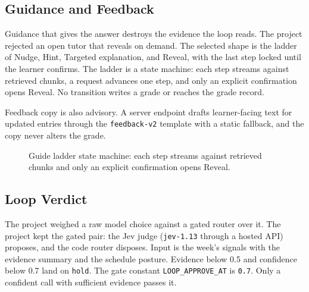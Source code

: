\subsection{Guidance and Feedback}
Guidance that gives the answer destroys the evidence the loop reads. The project rejected an open tutor that reveals on demand. The selected shape is the ladder of Nudge, Hint, Targeted explanation, and Reveal, with the last step locked until the learner confirms. The ladder is a state machine: each step streams against retrieved chunks, a request advances one step, and only an explicit confirmation opens Reveal. No transition writes a grade or reaches the grade record.

Feedback copy is also advisory. A server endpoint drafts learner-facing text for updated entries through the \texttt{feedback-v2} template with a static fallback, and the copy never alters the grade.

\begin{figure}[htbp]
\centering
{}
\caption{Guide ladder state machine: each step streams against retrieved chunks and only an explicit confirmation opens Reveal.}
\label{fig:guide-ladder}
\end{figure}

\subsection{Loop Verdict}
The project weighed a raw model choice against a gated router over it. The project kept the gated pair: the Jev judge (\texttt{jev-1.13} through a hosted API) proposes, and the code router disposes. Input is the week's signals with the evidence summary and the schedule posture. Evidence below 0.5 and confidence below 0.7 land on \texttt{hold}. The gate constant \texttt{LOOP\_APPROVE\_AT} is \texttt{0.7}. Only a confident call with sufficient evidence passes it.

